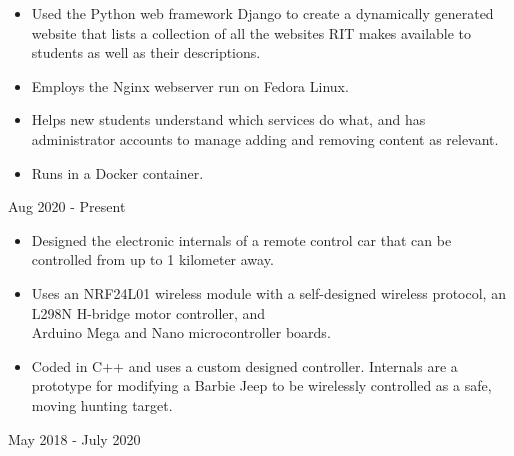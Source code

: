 \documentclass[11pt,letterpaper,ragged2e]{altacv}
\begin{document}

\begin{fullwidth}
\makecvheader
\end{fullwidth}



{
\begin{itemize}
    \item Used the Python web framework Django to create a dynamically generated website that lists a collection of all the websites RIT makes available to students as well as their descriptions.
    \item Employs the Nginx webserver run on Fedora Linux.
    \item Helps new students understand which services do what, and has administrator accounts to manage adding and removing content as relevant.
    \item Runs in a Docker container.
\end{itemize}
}
{Aug 2020 - Present}


{
\begin{itemize}
    \item Designed the electronic internals of a remote control car that can be controlled from up to 1 kilometer away.
    \item Uses an NRF24L01 wireless module with a self-designed wireless protocol, an L298N H-bridge motor controller, and \\ Arduino Mega and Nano microcontroller boards.
    \item Coded in C++ and uses a custom designed controller. Internals are a prototype for modifying a Barbie Jeep to be wirelessly controlled as a safe, moving hunting target.
\end{itemize}
}
{May 2018 - July 2020}
\end{document}
